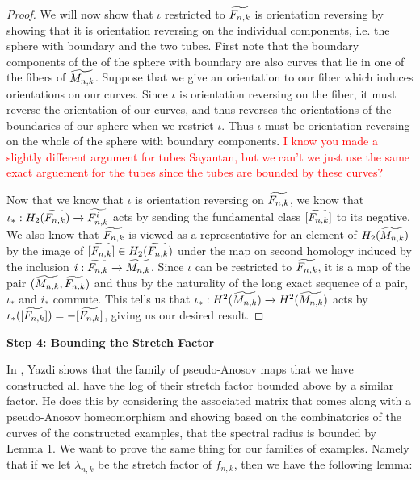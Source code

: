 \begin{proof}
We will now show that $\iota$ restricted to $\widetilde{F_{n,k}}$ is orientation reversing by showing that it is orientation reversing on the individual components, i.e. the sphere with boundary and the two tubes. First note that the boundary components of the of the sphere with boundary are also curves that lie in one of the fibers of $\widetilde{M_{n,k}}$. Suppose that we give an orientation to our fiber which induces orientations on our curves. Since $\iota$ is orientation reversing on the fiber, it must reverse the orientation of our curves, and thus reverses the orientations of the boundaries of our sphere when we restrict $\iota$. Thus $\iota$ must be orientation reversing on the whole of the sphere with boundary components. \textcolor{red}{I know you made a slightly different argument for tubes Sayantan, but we can't we just use the same exact arguement for the tubes since the tubes are bounded by these curves?}

Now that we know that $\iota$ is orientation reversing on $\widetilde{F_{n,k}}$, we know that $\iota_*: H_2(\widetilde{F_{n,k}}) \xrightarrow{} \widetilde{F^i_{n,k}}$ acts by sending the fundamental class $[\widetilde{F_{n,k}}]$ to its negative. We also know that $\widetilde{F_{n,k}}$ is viewed as a representative for an element of $H_2(\widetilde{M_{n,k}})$ by the image of $[\widetilde{F_{n,k}}] \in H_2(\widetilde{F_{n,k}})$ under the map on second homology induced by the inclusion $i: \widetilde{F_{n,k}} \xrightarrow[]{} \widetilde{M_{n,k}}$. Since $\iota$ can be restricted to $\widetilde{F_{n,k}}$, it is a map of the pair $(\widetilde{M_{n,k}},\widetilde{F_{n,k}})$ and thus by the naturality of the long exact sequence of a pair, $\iota_*$ and $i_*$ commute. This tells us that $\iota_*: H^2(\widetilde{M_{n,k}}) \xrightarrow[]{} H^2(\widetilde{M_{n,k}})$ acts by $\iota_*([\widetilde{F_{n,k}}]) = -[\widetilde{F_{n,k}}]$, giving us our desired result.
\end{proof}

\textbf{Step 4: Bounding the Stretch Factor} 

In \cite{yazdi2018pseudo}, Yazdi shows that the family of pseudo-Anosov maps that we have constructed all have the log of their stretch factor bounded above by a similar factor. He does this by considering the associated matrix that comes along with a pseudo-Anosov homeomorphism and showing based on the combinatorics of the curves of the constructed examples, that the spectral radius is bounded by Lemma 1. We want to prove the same thing for our families of examples. Namely that if we let $\lambda_{n,k}$ be the stretch factor of $f_{n,k}$, then we have the following lemma: 

